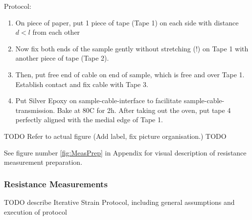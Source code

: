 Protocol:

\begin{enumerate}
    \item On piece of paper, put 1 piece of tape (Tape 1) on each side with distance $d < l$ from each other
    \item Now fix both ends of the sample gently without stretching (!) on Tape 1 with another piece of tape (Tape 2).
    \item Then, put free end of cable on end of sample, which is free and over Tape 1. Establish contact and fix cable with Tape 3.
    \item Put Silver Epoxy on sample-cable-interface to facilitate sample-cable-transmission. Bake at 80\textdegree C for 2h. After taking out the oven, put tape 4 perfectly aligned with the medial edge of Tape 1.
\end{enumerate}

    \begin{center}
    TODO
    Refer to actual figure (Add label, fix picture organisation.)
    TODO
    
See figure number \ref{fig:MeasPrep} in Appendix for visual description of resistance measurement preparation.
    \end{center}


\subsubsection{Resistance Measurements}


TODO describe Iterative Strain Protocol, including general assumptions and execution of protocol 